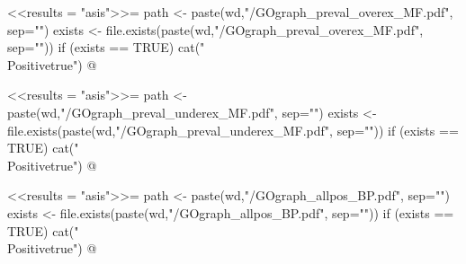 \documentclass{article}
\begin{document}
\newif\ifPositive

<<results = "asis">>=
path <- paste(wd,"/GOgraph_preval_overex_MF.pdf", sep="")
exists <- file.exists(paste(wd,"/GOgraph_preval_overex_MF.pdf", sep=""))
if (exists == TRUE) {
  cat("\\Positivetrue")
}
@

\ifPositive
  \subsection{GOgraphs showing overexpressed functions from prevalent DEGs}
  This is the GO graph concerning the overexpressed prevalent DEGs (Image extracted from {\bf"GOgraph\_preval\_overex\_MF.pdf"} file):
  \begin{center}
    \texttt{[image: \\Sexpr\{path]}}
  \end{center}
\fi


\newif\ifPositive

<<results = "asis">>=
path <- paste(wd,"/GOgraph_preval_underex_MF.pdf", sep="")
exists <- file.exists(paste(wd,"/GOgraph_preval_underex_MF.pdf", sep=""))
if (exists == TRUE) {
  cat("\\Positivetrue")
}
@

\ifPositive
  \subsection{GOgraphs showing underexpressed functions from prevalent DEGs}
  This is the GO graph concerning the underexpressed prevalent DEGs (Image extracted from {\bf"GOgraph\_preval\_underex\_MF.pdf"} file):
  \begin{center}
    \texttt{[image: \\Sexpr\{path]}}
  \end{center}
\fi



\newif\ifPositive

<<results = "asis">>=
path <- paste(wd,"/GOgraph_allpos_BP.pdf", sep="")
exists <- file.exists(paste(wd,"/GOgraph_allpos_BP.pdf", sep=""))
if (exists == TRUE) {
  cat("\\Positivetrue")
}
@

\ifPositive
 \section{GO graphs of all possible DEGs: Biological Process (BP))}
 \subsection{General GOgraph of all possible DEGs}
 This is the GO graph provided by the topGO package (Image extracted from {\bf"GOgraph\_allpos\_BP.pdf"} file):
  \begin{center}
    \texttt{[image: \\Sexpr\{path]}}
  \end{center}
\fi
\end{document}
